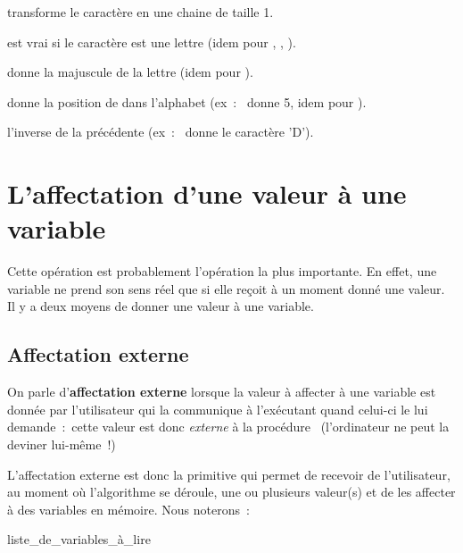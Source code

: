 			\begin{liste}
			\item {} transforme le caractère  en une chaine de taille 1.
			\item {} est vrai si le caractère  est une lettre
				(idem pour , 
				, 
				).
			\item {} donne la majuscule de la lettre 
				(idem pour ).
			\item {} donne la position de  dans l’alphabet (ex~:~ donne 5, 
			idem pour ).
			\item {} l’inverse de la précédente (ex~:~ donne le caractère ’D’).
			\end{liste}

			 
	\section{L’affectation d’une valeur à une variable}

		Cette opération est probablement l’opération la plus importante. En
		effet, une variable ne prend son sens réel que si elle reçoit à un
		moment donné une valeur. Il y a deux moyens de donner une valeur à une
		variable.

		\subsection{Affectation externe }

			On parle d’\textbf{affectation externe} lorsque la valeur à affecter à
			une variable est donnée par l’utilisateur qui la communique à
			l’exécutant quand celui-ci le lui demande~:~cette valeur est donc
			\textit{externe} à la procédure \ (l’ordinateur ne peut la deviner
			lui-même~!)

			L’affectation externe est donc la primitive qui permet de recevoir de
			l’utilisateur, au moment où l’algorithme se déroule,
			une ou plusieurs valeur(s) et de les affecter à des variables en
			mémoire. Nous noterons~:

			\begin{Pseudocode}
			\Read liste\_de\_variables\_à\_lire
			\end{Pseudocode}
			
